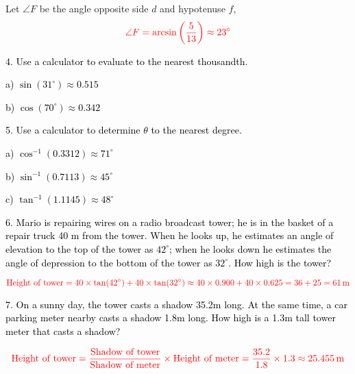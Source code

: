\documentclass{article}
\begin{document}
Let $\angle F$ be the angle opposite side $d$ and hypotenuse $f$,
\[
\textcolor{red}{\angle F = \arcsin\left(\frac{5}{13}\right) \approx 23^\circ}
\]

\textcolor{black}{4. Use a calculator to evaluate to the nearest thousandth.}

\textcolor{black}{a) $\sin(31^\circ) \approx 0.515$}

\textcolor{black}{b) $\cos(70^\circ) \approx 0.342$}

\textcolor{black}{5. Use a calculator to determine $\theta$ to the nearest degree.}

\textcolor{black}{a) $\cos^{-1}(0.3312) \approx 71^\circ$}

\textcolor{black}{b) $\sin^{-1}(0.7113) \approx 45^\circ$}

\textcolor{black}{c) $\tan^{-1}(1.1145) \approx 48^\circ$}

\textcolor{black}{6. Mario is repairing wires on a radio broadcast tower; he is in the basket of a repair truck 40 m from the tower. When he looks up, he estimates an angle of elevation to the top of the tower as $42^\circ$; when he looks down he estimates the angle of depression to the bottom of the tower as $32^\circ$. How high is the tower?}

\[
\textcolor{red}{\text{Height of tower} = 40 \times \tan(42^\circ) + 40 \times \tan(32^\circ) \approx 40 \times 0.900 + 40 \times 0.625 = 36 + 25 = 61 \, \text{m}}
\]

\textcolor{black}{7. On a sunny day, the tower casts a shadow 35.2m long. At the same time, a car parking meter nearby casts a shadow 1.8m long. How high is a 1.3m tall tower meter that casts a shadow?}

\[
\textcolor{red}{\text{Height of tower} = \frac{\text{Shadow of tower}}{\text{Shadow of meter}} \times \text{Height of meter} = \frac{35.2}{1.8} \times 1.3 \approx 25.455 \, \text{m}}
\]
\end{document}

